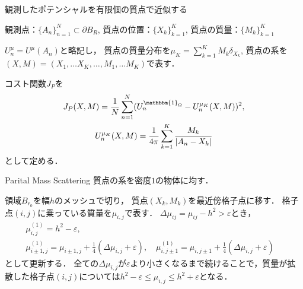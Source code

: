 \documentclass[dvipdfmx]{beamer}
\begin{document}
\begin{frame}{観測したポテンシャルを有限個の質点で近似する}
  \begin{screen}
    観測点：$\{A_n\}_{n=1}^N\subset \partial B_R$,
    質点の位置：$\{X_k\}_{k=1}^K$,
    質点の質量：$\{M_k\}_{k=1}^K$ 
  \end{screen}

  $U_n^\mu=U^\mu(A_n)$と略記し，
  質点の質量分布を$\mu_K = \sum_{k=1}^K M_k\delta_{X_k}$,
  質点の系を$(X,M)=(X_1,\dots X_K,\dots ,M_1,\dots M_K)$で表す．


  コスト関数$J_P$を
  \begin{gather*}
    J_P(X, M) = \frac{1}{N}\sum_{n=1}^N(U^{\mathbbm{1}_\Omega}_n - U^{\mu_K}_n(X,M))^2, \\
    U^{\mu_K}_n(X,M) = \frac{1}{4\pi}\sum_{k=1}^K \frac{M_k}{|A_n-X_k|}
  \end{gather*}
  として定める．
\end{frame}


\begin{frame}{Parital Mass Scattering}
  質点の系を密度$1$の物体に均す．

  領域$B_{r_0}$を幅$h$のメッシュで切り，
  質点$(X_k,M_k)$を最近傍格子点に移す．
  格子点$(i,j)$に乗っている質量を$\mu_{i,j}$で表す．
  $\Delta\mu_{ij} = \mu_{ij}-h^2 > \varepsilon$とき，
  \begin{gather*}
    \mu_{i,j}^{(1)}=h^2-\varepsilon, \\
    \mu_{i\pm 1,j}^{(1)}=\mu_{i\pm 1,j}+\frac{1}{4}(\Delta \mu_{i,j}+\varepsilon),\quad
    \mu_{i,j\pm 1}^{(1)}=\mu_{i,j\pm 1}+\frac{1}{4}(\Delta \mu_{i,j}+\varepsilon)\quad
  \end{gather*}
  として更新する．
  全ての$\Delta\mu_{i,j}$が$\varepsilon$より小さくなるまで続けることで，質量が拡散した格子点$(i,j)$については$h^2-\varepsilon\leq\mu_{i,j}\leq h^2+\varepsilon$となる．

  \begin{figure}
  \end{figure}

\end{frame}
\end{document}
